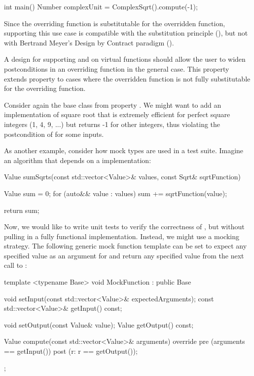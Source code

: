 \begin{codeblock}
int main() {
  Number complexUnit = ComplexSqrt().compute(-1);
}
\end{codeblock}

Since the overriding function is substitutable for the overridden function, supporting this use case is compatible with the substitution principle (), but not with Bertrand Meyer's Design by Contract paradigm ().


A design for supporting  and  on virtual functions should allow the user to widen postconditions in an overriding function in the general case. This property extends property  to cases where the overridden function is not fully substitutable for the overriding function. 

Consider again the base class  from property . We might want to add an implementation of square root  that is extremely efficient for perfect square integers (1, 4, 9, ...) but returns -1 for other integers, thus violating the postcondition of  for some inputs.

As another example, consider how mock types are used in a test suite. Imagine an algorithm that depends on a  implementation:

\begin{codeblock}
Value sumSqrts(const std::vector<Value>& values, const Sqrt& sqrtFunction) {
  Value sum = 0;
  for (auto&& value : values)
    sum += sqrtFunction(value);
    
  return sum;
}
\end{codeblock}

Now, we would like to write unit tests to verify the correctness of , but without pulling in a fully functional  implementation. Instead, we might use a mocking strategy. The following generic mock function template can be set to expect any specified value as an argument for and return any specified value from the next call to :

\begin{codeblock}
template <typename Base>
void MockFunction : public Base {
  void setInput(const std::vector<Value>& expectedArguments);
  const std::vector<Value>& getInput() const;
  
  void setOutput(const Value& value);
  Value getOutput() const;
  
  Value compute(const std::vector<Value>& arguments) override
    pre (arguments == getInput())
    post (r: r == getOutput());
};
\end{codeblock}

